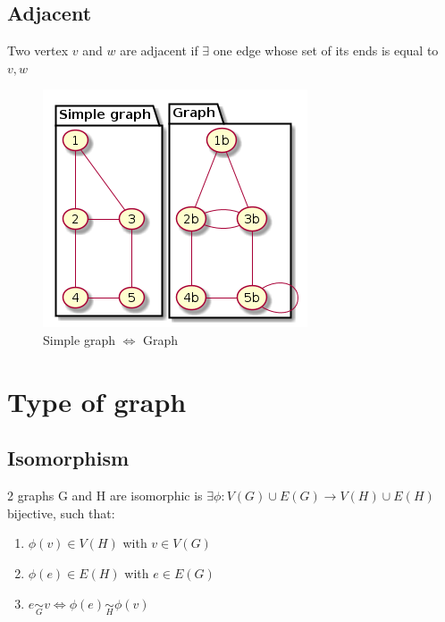     \subsection{Adjacent}
        Two vertex $v$ and $w$ are adjacent if $\exists$ one edge whose set of its ends is equal to ${v, w}$\\
        \begin{figure}[h]
            \centering
            \includegraphics[scale=0.5]{ressources/images/GraphSimpleGraph.png}
            \caption{Simple graph $\Leftrightarrow$ Graph}
            \label{Simple graph & Graph}
        \end{figure}

\section{Type of graph}
    \subsection{Isomorphism}
        2 graphs G and H are isomorphic is $\exists \phi : V(G) \cup E(G) \rightarrow V(H) \cup E(H)$ bijective, such that:
        \begin{enumerate}
            \item $\phi(v)\in V(H)$ with $v\in V(G)$
            \item $\phi(e)\in E(H)$ with $e\in E(G)$
            \item $e\underset{G}{\sim}v \iff \phi(e)\underset{H}{\sim}\phi(v)$
        \end{enumerate}
